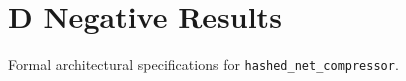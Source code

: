 \section{D Negative Results}

Formal architectural specifications for \texttt{hashed_net_compressor}.
